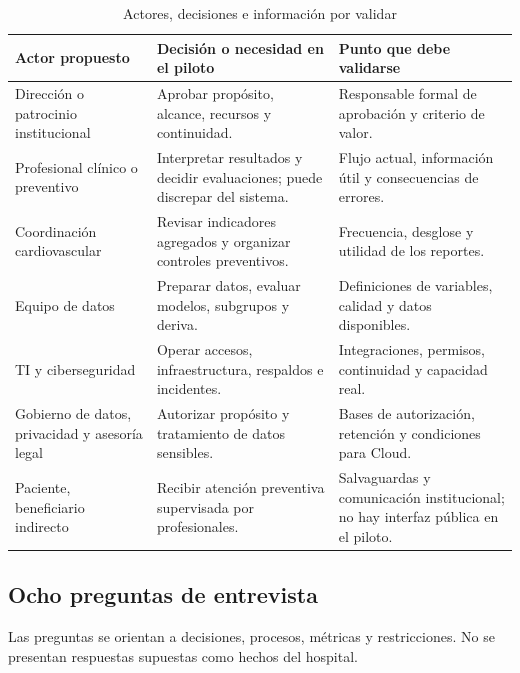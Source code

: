 \documentclass[12pt,a4paper]{article}
\begin{document}
\begin{table}[H]
  \centering
  \caption{Actores, decisiones e información por validar}
  \label{tab:act1-stakeholders}
  \scriptsize
  \begin{tabularx}{\textwidth}{@{}lXX@{}}
    \toprule
    Actor propuesto & Decisión o necesidad en el piloto & Punto que debe validarse \\
    \midrule
    Dirección o patrocinio institucional & Aprobar propósito, alcance, recursos y continuidad. & Responsable formal de aprobación y criterio de valor. \\
    Profesional clínico o preventivo & Interpretar resultados y decidir evaluaciones; puede discrepar del sistema. & Flujo actual, información útil y consecuencias de errores. \\
    Coordinación cardiovascular & Revisar indicadores agregados y organizar controles preventivos. & Frecuencia, desglose y utilidad de los reportes. \\
    Equipo de datos & Preparar datos, evaluar modelos, subgrupos y deriva. & Definiciones de variables, calidad y datos disponibles. \\
    TI y ciberseguridad & Operar accesos, infraestructura, respaldos e incidentes. & Integraciones, permisos, continuidad y capacidad real. \\
    Gobierno de datos, privacidad y asesoría legal & Autorizar propósito y tratamiento de datos sensibles. & Bases de autorización, retención y condiciones para Cloud. \\
    Paciente, beneficiario indirecto & Recibir atención preventiva supervisada por profesionales. & Salvaguardas y comunicación institucional; no hay interfaz pública en el piloto. \\
    \bottomrule
  \end{tabularx}
\end{table}

\subsection{Ocho preguntas de entrevista}

Las preguntas se orientan a decisiones, procesos, métricas y restricciones. No se presentan respuestas supuestas como hechos del hospital.
\end{document}
